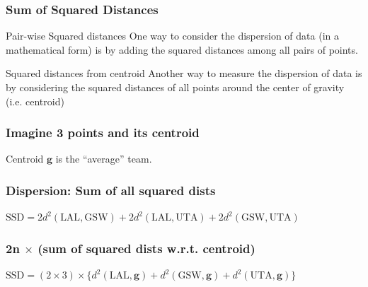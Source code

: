 \documentclass[12pt]{beamer}\usepackage[]{graphicx}\usepackage[]{color}
\begin{document}
\begin{frame}
\frametitle{Sum of Squared Distances}

\begin{block}{Pair-wise Squared distances}
One way to consider the dispersion of data (in a mathematical form) is by adding the 
squared distances among all pairs of points.
\end{block}

\begin{block}{Squared distances from centroid}
Another way to measure the dispersion of data is by considering the
squared distances of all points around the center of gravity (i.e. centroid)
\end{block}

\end{frame}


\begin{frame}
\frametitle{Imagine 3 points and its centroid}
\begin{center}

Centroid $\mathbf{g}$ is the ``average'' team.
\end{center}
\end{frame}


\begin{frame}
\frametitle{Dispersion: Sum of all squared dists}
\begin{center}

{\footnotesize
$\text{SSD} = 2 d^2(\text{LAL}, \text{GSW}) + 2 d^2(\text{LAL}, \text{UTA}) + 2 d^2(\text{GSW}, \text{UTA})$
}
\end{center}
\end{frame}


\begin{frame}
\frametitle{2n $\times$ (sum of squared dists w.r.t. centroid)}
\begin{center}

{\footnotesize
$\text{SSD} = (2 \times 3) \times \{ d^2(\text{LAL}, \mathbf{g}) + d^2(\text{GSW}, \mathbf{g}) + d^2(\text{UTA}, \mathbf{g}) \}$
}
\end{center}
\end{frame}
\end{document}

